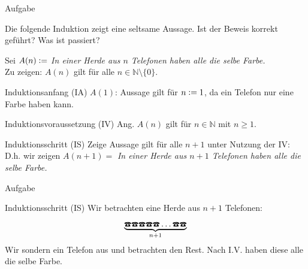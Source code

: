 %
%
%
%

{
	\begin{frame}[fragile]{Aufgabe}
		\begin{alertblock}{Die folgende Induktion zeigt eine seltsame Aussage.}
			Ist der Beweis korrekt geführt? Was ist passiert?
		\end{alertblock}
		Sei $A(n)\vcentcolon=$ \emph{In einer Herde aus $n$ Telefonen haben alle die selbe Farbe.}\\
		Zu zeigen: $A(n)$ gilt für alle $n \in \mathbb{N} \setminus \{0\} $.
		\begin{alertblock}{Induktionsanfang (IA)}
			$A(1)$: Aussage gilt für $n\vcentcolon= 1$, da ein Telefon nur eine Farbe haben kann.
		\end{alertblock}
		\begin{alertblock}{Induktionsvoraussetzung (IV)}
			Ang. $A(n)$ gilt für $n\in\mathbb{N}$ mit $n\geq1$.
		\end{alertblock}
		\begin{alertblock}{Induktionsschritt (IS)}
			Zeige Aussage gilt für alle $n+1$ unter Nutzung der IV:\\
			D.h. wir zeigen $A(n+1)=$ \emph{In einer Herde aus $n+1$ Telefonen haben alle die selbe Farbe.}
		\end{alertblock}
	\end{frame}
	\begin{frame}[fragile]{Aufgabe}
		\footnotesize{
			\begin{alertblock}{Induktionsschritt (IS)}
				Wir betrachten eine Herde aus $n+1$ Telefonen:
				\[\underbrace{\text{\Telefon}\text{\Telefon}\text{\Telefon}\text{\Telefon}\text{\Telefon}\dots\text{\Telefon}\text{\Telefon}}_{n+1}\]
				Wir sondern ein Telefon aus und betrachten den Rest. Nach I.V. haben diese alle die selbe Farbe.

\end{alertblock}}
\end{frame}}
